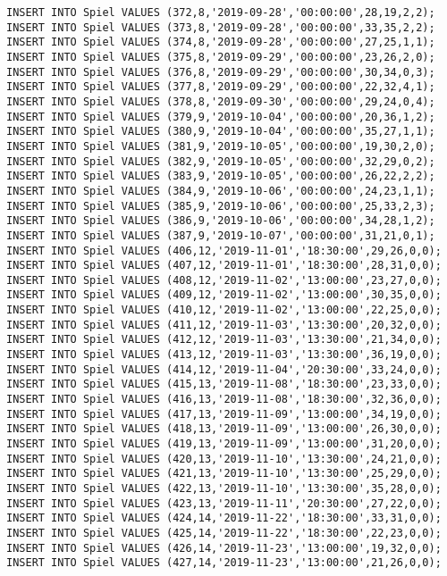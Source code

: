\documentclass{lehramt-informatik-aufgabe}
\begin{document}
\begin{verbatim}
INSERT INTO Spiel VALUES (372,8,'2019-09-28','00:00:00',28,19,2,2);
INSERT INTO Spiel VALUES (373,8,'2019-09-28','00:00:00',33,35,2,2);
INSERT INTO Spiel VALUES (374,8,'2019-09-28','00:00:00',27,25,1,1);
INSERT INTO Spiel VALUES (375,8,'2019-09-29','00:00:00',23,26,2,0);
INSERT INTO Spiel VALUES (376,8,'2019-09-29','00:00:00',30,34,0,3);
INSERT INTO Spiel VALUES (377,8,'2019-09-29','00:00:00',22,32,4,1);
INSERT INTO Spiel VALUES (378,8,'2019-09-30','00:00:00',29,24,0,4);
INSERT INTO Spiel VALUES (379,9,'2019-10-04','00:00:00',20,36,1,2);
INSERT INTO Spiel VALUES (380,9,'2019-10-04','00:00:00',35,27,1,1);
INSERT INTO Spiel VALUES (381,9,'2019-10-05','00:00:00',19,30,2,0);
INSERT INTO Spiel VALUES (382,9,'2019-10-05','00:00:00',32,29,0,2);
INSERT INTO Spiel VALUES (383,9,'2019-10-05','00:00:00',26,22,2,2);
INSERT INTO Spiel VALUES (384,9,'2019-10-06','00:00:00',24,23,1,1);
INSERT INTO Spiel VALUES (385,9,'2019-10-06','00:00:00',25,33,2,3);
INSERT INTO Spiel VALUES (386,9,'2019-10-06','00:00:00',34,28,1,2);
INSERT INTO Spiel VALUES (387,9,'2019-10-07','00:00:00',31,21,0,1);
INSERT INTO Spiel VALUES (406,12,'2019-11-01','18:30:00',29,26,0,0);
INSERT INTO Spiel VALUES (407,12,'2019-11-01','18:30:00',28,31,0,0);
INSERT INTO Spiel VALUES (408,12,'2019-11-02','13:00:00',23,27,0,0);
INSERT INTO Spiel VALUES (409,12,'2019-11-02','13:00:00',30,35,0,0);
INSERT INTO Spiel VALUES (410,12,'2019-11-02','13:00:00',22,25,0,0);
INSERT INTO Spiel VALUES (411,12,'2019-11-03','13:30:00',20,32,0,0);
INSERT INTO Spiel VALUES (412,12,'2019-11-03','13:30:00',21,34,0,0);
INSERT INTO Spiel VALUES (413,12,'2019-11-03','13:30:00',36,19,0,0);
INSERT INTO Spiel VALUES (414,12,'2019-11-04','20:30:00',33,24,0,0);
INSERT INTO Spiel VALUES (415,13,'2019-11-08','18:30:00',23,33,0,0);
INSERT INTO Spiel VALUES (416,13,'2019-11-08','18:30:00',32,36,0,0);
INSERT INTO Spiel VALUES (417,13,'2019-11-09','13:00:00',34,19,0,0);
INSERT INTO Spiel VALUES (418,13,'2019-11-09','13:00:00',26,30,0,0);
INSERT INTO Spiel VALUES (419,13,'2019-11-09','13:00:00',31,20,0,0);
INSERT INTO Spiel VALUES (420,13,'2019-11-10','13:30:00',24,21,0,0);
INSERT INTO Spiel VALUES (421,13,'2019-11-10','13:30:00',25,29,0,0);
INSERT INTO Spiel VALUES (422,13,'2019-11-10','13:30:00',35,28,0,0);
INSERT INTO Spiel VALUES (423,13,'2019-11-11','20:30:00',27,22,0,0);
INSERT INTO Spiel VALUES (424,14,'2019-11-22','18:30:00',33,31,0,0);
INSERT INTO Spiel VALUES (425,14,'2019-11-22','18:30:00',22,23,0,0);
INSERT INTO Spiel VALUES (426,14,'2019-11-23','13:00:00',19,32,0,0);
INSERT INTO Spiel VALUES (427,14,'2019-11-23','13:00:00',21,26,0,0);

\end{verbatim}
\end{document}
